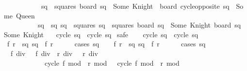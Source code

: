 \begin{isabellebody}
\ \ \ \ \ \ \ \ \ \ {\isachardoublequoteopen}{\isasymforall}\ sq\ {\isasymin}\ squares{\isachardot}\ board\ sq\ {\isacharequal}\ Some\ Knight\ {\isasymlongrightarrow}\ board\ {\isacharparenleft}cycle{\isacharunderscore}opposite\ sq{\isacharparenright}\ {\isacharequal}\ Some\ Queen{\isachardoublequoteclose}\isanewline
\ \ \ \ \ \ \ \ \ \ {\isachardoublequoteopen}sq{}\ {\isasymnoteq}\ sq{}{\isachardoublequoteclose}\ {\isachardoublequoteopen}sq{}\ {\isasymin}\ squares{\isachardoublequoteclose}\ {\isachardoublequoteopen}sq{}\ {\isasymin}\ squares{\isachardoublequoteclose}\ {\isachardoublequoteopen}board\ sq{}\ {\isacharequal}\ Some\ Knight{\isachardoublequoteclose}\ {\isachardoublequoteopen}board\ sq{}\ {\isacharequal}\ Some\ Knight{\isachardoublequoteclose}\isanewline
\ \ \ {\isachardoublequoteopen}cycle\ sq{}\ {\isasymnoteq}\ cycle\ sq{}{\isachardoublequoteclose}\isanewline
%
\isadelimproof
%
\endisadelimproof
%
\isatagproof
{}\isamarkupfalse%
\ safe\isanewline
\ \ \isamarkupfalse%
\ {\isachardoublequoteopen}cycle\ sq{}\ {\isacharequal}\ cycle\ sq{}{\isachardoublequoteclose}\isanewline
\ \ \isamarkupfalse%
\ f{}\ r{}\ \ sq{}{\isacharcolon}\ {\isachardoublequoteopen}sq{}\ {\isacharequal}\ {\isacharparenleft}f{}{\isacharcomma}\ r{}{\isacharparenright}{\isachardoublequoteclose}\isanewline
\ \ \ \ \isamarkupfalse%
\ {\isacharparenleft}cases\ sq{}{\isacharparenright}\isanewline
\ \ \isamarkupfalse%
\ f{}\ r{}\ \ sq{}{\isacharcolon}\ {\isachardoublequoteopen}sq{}\ {\isacharequal}\ {\isacharparenleft}f{}{\isacharcomma}\ r{}{\isacharparenright}{\isachardoublequoteclose}\isanewline
\ \ \ \ \isamarkupfalse%
\ {\isacharparenleft}cases\ sq{}{\isacharparenright}\isanewline
\isanewline
\ \ \isamarkupfalse%
\ {\isacharasterisk}{\isacharasterisk}{\isacharcolon}\ {\isachardoublequoteopen}f{}\ div\ {}\ {\isacharequal}\ f{}\ div\ {}{\isachardoublequoteclose}\ {\isachardoublequoteopen}r{}\ div\ {}\ {\isacharequal}\ r{}\ div\ {}{\isachardoublequoteclose}\isanewline
\ \ \ \ \ \ \ \ \ \ \ \ {\isachardoublequoteopen}cycle{}\ {\isacharparenleft}f{}\ mod\ {}{\isacharcomma}\ r{}\ mod\ {}{\isacharparenright}\ {\isacharequal}\ cycle{}\ {\isacharparenleft}f{}\ mod\ {}{\isacharcomma}\ r{}\ mod\ {}{\isacharparenright}{\isachardoublequoteclose}\isanewline

\end{isabellebody}
